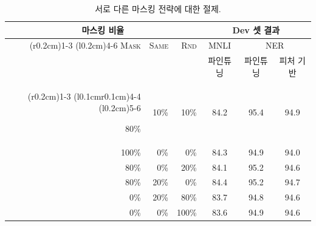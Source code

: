 \begin{table}[ht]
\begin{center}
{\small
\begin{tabular}{@{}rrrccc@{}}
  \toprule
  \multicolumn{3}{c}{마스킹 비율} & \multicolumn{3}{c}{Dev 셋 결과} \\
  \cmidrule(r{0.2cm}){1-3}
  \cmidrule(l{0.2cm}){4-6}
  \textsc{Mask} &	\textsc{Same}&	\textsc{Rnd}	& {MNLI} &	\multicolumn{2}{c}{NER}\\
   &  & & {\footnotesize 파인튜닝} &   {\footnotesize 파인튜닝}	& {\footnotesize 피처 기반}\\
    \cmidrule(r{0.2cm}){1-3}
  \cmidrule(l{0.1cm}r{0.1cm}){4-4}
  \cmidrule(l{0.2cm}){5-6}
  
  80\%	&10\%	&10\%	&84.2	&95.4	&94.9\\
100\%	&0\%	&0\%	&84.3	&94.9	&94.0\\
80\%	&0\%	&20\%	&84.1	&95.2	&94.6\\
80\%	&20\%	&0\%	&84.4	&95.2	&94.7\\
0\%	&20\%	&80\%	&83.7	&94.8	&94.6 \\
0\%	&0\%	&100\%	&83.6	&94.9	&94.6\\
\bottomrule
\end{tabular}
} %
\end{center}
\caption{\label{tab:mask_ablation} 서로 다른 마스킹 전략에 대한 절제.}
\end{table}

